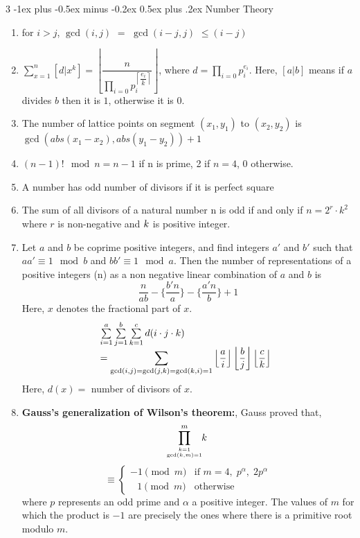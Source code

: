 \documentclass[8pt,a4paper,onesided]{article}
\makeatletter
\renewcommand{\subsection}{\@startsection{subsection}{2}{0mm}
    {-1ex plus -0.5ex minus -0.2ex} %
    {0.5ex plus .2ex}                %
    {\normalfont\large\bfseries}}    %
\makeatother
\begin{document}
\begin{multicols}{3}
\subsection{Number Theory}
\begin{enumerate}[resume]
    \item for $i > j$, $\displaystyle \gcd(i, j)$ $=$ $\displaystyle \gcd(i -j, j)$ $\displaystyle \leq (i -j)$
    \item $\displaystyle \sum_{x = 1}^n \left[ d | x^k \right] = \left \lfloor\dfrac{n}{\prod_{i = 0}{p_i^{\left \lceil \dfrac{e_i}{k}\right \rceil}}}\right \rfloor$,
    where $d = \prod_{i = 0}{p_i^{e_i}}$. Here, $[a | b]$ means if $\displaystyle a$ divides $b$ then it is $\displaystyle 1$, otherwise it is $0$.
    \item The number of lattice points on segment $\displaystyle (x_1,y_1)$ to $\displaystyle (x_2,y_2)$ is $\displaystyle \gcd(abs(x_1-x_2),abs(y_1-y_2)) + 1$
    \item $\displaystyle (n-1)! \mod  n = n -1$ if n is prime, 2 if $n = 4$, $0$ otherwise.
    \item A number has odd number of divisors if it is perfect square
    \item The sum of all divisors of a natural number n is odd if and only if $n=2^r\cdot k^2$ where $r$ is non-negative and $\displaystyle \displaystyle k$ is positive integer.
    \item Let $\displaystyle a$ and $b$ be coprime positive integers, and find integers $\displaystyle a{\prime}$ and $b{\prime}$ such that $\displaystyle aa{\prime} \equiv 1 \mod b$ and $bb{\prime} \equiv 1 \mod a$. Then the number of representations of a positive integers (n) as a non negative linear combination of $\displaystyle a$ and $b$ is
    \[\displaystyle \frac{n}{ab}-\Big\{\frac{b{\prime} n}{a}\Big\}-\Big\{\frac{a{\prime} n}{b}\Big\} + 1\]
    Here, $\displaystyle {x}$ denotes the fractional part of $\displaystyle x$.
\[
\begin{array}{@{}l}
\sum \limits_{i=1}^{a}\sum \limits_{j=1}^{b}\sum \limits_{k=1}^{c} d(i \cdot j \cdot k)
\\ =
\displaystyle \sum \limits_{\gcd (i,j)=\gcd (j,k) = \gcd (k,i) =1}
\displaystyle \left \lfloor \dfrac{a}{i}\right \rfloor \left \lfloor \dfrac{b}{j}\right \rfloor \left \lfloor \dfrac{c}{k} \right \rfloor
\end{array}
\]
    Here, $d(x) =$ number of divisors of $\displaystyle x$.
    \item \textbf{Gauss’s generalization of Wilson’s theorem:},
    Gauss proved that,
    \[\displaystyle \prod \limits_{k=1 \atop \gcd(k,m)=1}^{m}\!\!k\ \]
    \[\displaystyle \equiv {\begin{cases}-1{\pmod {m}}&{\text{if }}m=4,\;p^{\alpha },\;2p^{\alpha }\\\;\;\,1{\pmod {m}}&{\text{otherwise}}\end{cases}}\]
    where $\displaystyle p$ represents an odd prime and $\displaystyle \alpha$ a positive integer. The values of $m$ for which the product is $-1$ are precisely the ones where there is a primitive root modulo $m$.
\end{enumerate}

\end{multicols}
\end{document}
